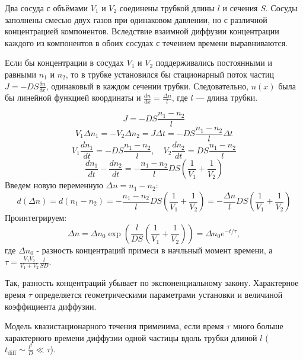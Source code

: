 \documentclass[a4paper,12pt]{article} %
\begin{document}
Два сосуда с объёмами $V_1$ и $V_2$ соединены трубкой длины $l$ и сечения $S$. Сосуды заполнены смесью двух газов при одинаковом давлении, но с различной концентрацией компонентов. Вследствие взаимной диффузии концентрации каждого из компонентов в обоих сосудах с течением времени выравниваются.

Если бы концентрации в сосудах $V_1$ и $V_2$ поддерживались постоянными и равными $n_1$ и $n_2$, то в трубке установился бы стационарный поток частиц $J = - DS \frac{\delta n}{\delta x}$, одинаковый в каждом сечении трубки. Следовательно, $n(x)$ была бы линейной функцией координаты и $\frac{dn}{dx} = \frac{\Delta n}{l}$, где $l$ — длина трубки. 

\begin{equation}
  J = - DS \frac{n_1 - n_2}{l} 
\end{equation}
\begin{equation}
  V_1 \Delta n_1 = - V_2 \Delta n_2 = J \Delta t = - DS \frac{n_1 - n_2}{l} \Delta t
\end{equation}
\begin{equation}
  V_1 \frac{dn_1}{dt} = - DS \frac{n_1 - n_2}{l}, \quad V_2 \frac{dn_2}{dt} = DS \frac{n_1 - n_2}{l}
\end{equation}
\begin{equation}
  \frac{dn_1}{dt} - \frac{dn_2}{dt} = - \frac{n_1 - n_2}l DS \left( \frac1{V_1} + \frac1{V_2} \right)
\end{equation}
Введем новую переменную $\Delta n = n_1 - n_2$:
\begin{equation}
  d(\Delta n) = d(n_1 - n_2) = - \frac{n_1 - n_2}l DS \left( \frac1{V_1} + \frac1{V_2} \right) = - \frac{\Delta n}l DS \left( \frac1{V_1} + \frac1{V_2} \right)
\end{equation}
Проинтегрируем:
\begin{equation}
  \Delta n = \Delta n_0 \exp \left( \frac{l}{DS} \left( \frac{1}{V_1} + \frac{1}{V_2} \right) \right) = \Delta n_0 e^{-t/\tau},
  \label{exp}
\end{equation}
где $\Delta n_0$ - разность концентраций примеси в начльный момент времени, а \( \tau = \frac{V_1 V_2}{V_1 + V_2} \frac {l}{SD} \).

Так, разность концентраций убывает по экспоненциальному закону. Характерное время $\tau$ определяется геометрическими параметрами установки и величиной коэффициента диффузии.

Модель квазистационарного течения применима, если время $\tau$ много больше характерного времени диффузии одной частицы вдоль трубки длиной $l$ (\( t_{\text{diff}} \sim \frac{l^2}{D} \ll \tau \)).
\end{document}
